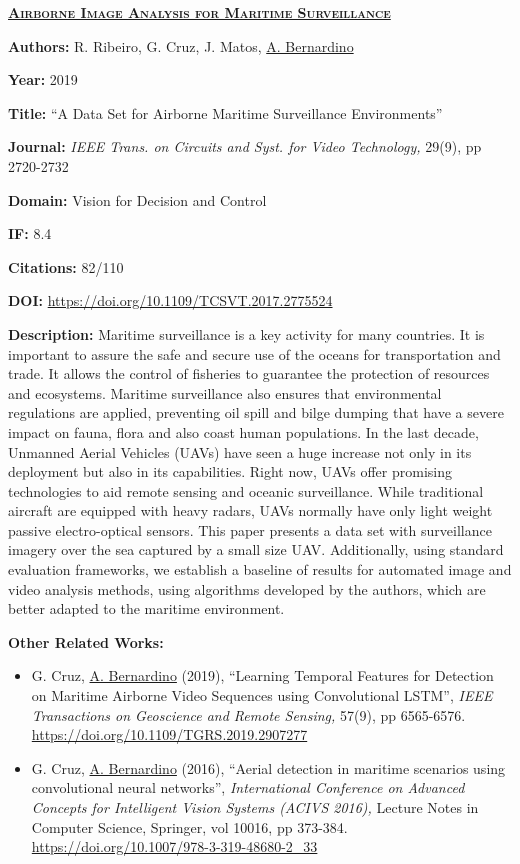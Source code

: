 \documentclass[
]{article}
\begin{document}
\textbf{\textsc{\ul{Airborne Image Analysis for Maritime Surveillance}}}

\textbf{Authors:} R. Ribeiro, G. Cruz, J. Matos, \ul{A. Bernardino}

\textbf{Year:} 2019

\textbf{Title:} ``A Data Set for Airborne Maritime Surveillance
Environments''

\textbf{Journal:} \emph{IEEE Trans. on Circuits and Syst. for Video
Technology,} 29(9), pp 2720-2732

\textbf{Domain:} Vision for Decision and Control

\textbf{IF:} 8.4

\textbf{Citations:} 82/110

\textbf{DOI:} \url{https://doi.org/10.1109/TCSVT.2017.2775524}~~

\textbf{Description:} Maritime surveillance is a key activity for many
countries. It is important to assure the safe and secure use of the
oceans for transportation and trade. It allows the control of fisheries
to guarantee the protection of resources and ecosystems. Maritime
surveillance also ensures that environmental regulations are applied,
preventing oil spill and bilge dumping that have a severe impact on
fauna, flora and also coast human populations. In the last decade,
Unmanned Aerial Vehicles (UAVs) have seen a huge increase not only in
its deployment but also in its capabilities. Right now, UAVs offer
promising technologies to aid remote sensing and oceanic surveillance.
While traditional aircraft are equipped with heavy radars, UAVs normally
have only light weight passive electro-optical sensors. This paper
presents a data set with surveillance imagery over the sea captured by a
small size UAV. Additionally, using standard evaluation frameworks, we
establish a baseline of results for automated image and video analysis
methods, using algorithms developed by the authors, which are better
adapted to the maritime environment.

\textbf{Other Related Works:}

\begin{itemize}
\item
  G. Cruz, \ul{A. Bernardino} (2019), ``Learning Temporal Features for
  Detection on Maritime Airborne Video Sequences using Convolutional
  LSTM'', \emph{IEEE Transactions on Geoscience and Remote Sensing,}
  57(9), pp 6565-6576.
  \url{https://doi.org/10.1109/TGRS.2019.2907277}~~~
\item
  G. Cruz, \ul{A. Bernardino} (2016), ``Aerial detection in maritime
  scenarios using convolutional neural networks'', \emph{International
  Conference on Advanced Concepts for Intelligent Vision Systems (ACIVS
  2016),} Lecture Notes in Computer Science, Springer, vol 10016, pp
  373-384. \url{https://doi.org/10.1007/978-3-319-48680-2_33}
\end{itemize}
\end{document}
